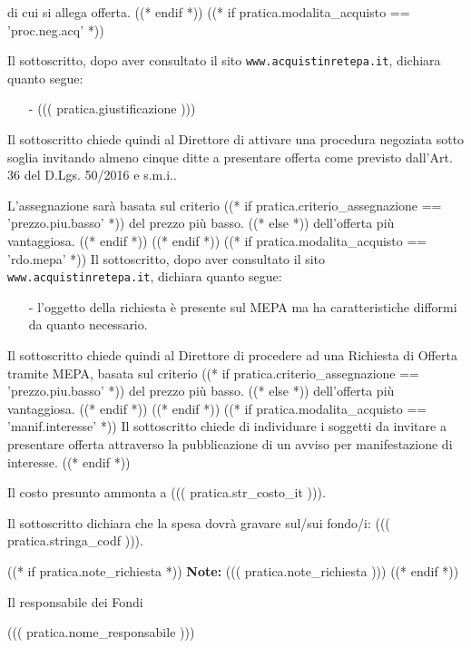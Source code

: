 \documentclass[a4paper,12pt]{letter}
\begin{document}
di cui si allega offerta.
((* endif *))
((* if pratica.modalita_acquisto == 'proc.neg.acq' *))

Il sottoscritto, dopo aver consultato il sito {\tt www.acquistinretepa.it},
dichiara quanto segue:

\begin{itemize}
\item[-] ((( pratica.giustificazione )))
\end{itemize}

Il sottoscritto chiede quindi al Direttore di attivare una procedura negoziata
sotto soglia invitando almeno cinque ditte a presentare offerta come previsto
dall'Art. 36 del D.Lgs. 50/2016 e s.m.i..

L'assegnazione sar\`a basata sul criterio %
   ((* if pratica.criterio_assegnazione == 'prezzo.piu.basso' *)) %
del prezzo pi\`u basso.
   ((* else *)) %
dell'offerta pi\`u vantaggiosa.
   ((* endif *))
((* endif *))
((* if pratica.modalita_acquisto == 'rdo.mepa' *))
Il sottoscritto, dopo aver consultato il sito {\tt www.acquistinretepa.it},
dichiara quanto segue:

\begin{itemize}
\item[-] l'oggetto della richiesta \`e presente sul MEPA ma ha caratteristiche difformi
da quanto necessario.
\end{itemize}

Il sottoscritto chiede quindi al Direttore di procedere ad una Richiesta di Offerta
tramite MEPA, basata sul criterio %
   ((* if pratica.criterio_assegnazione == 'prezzo.piu.basso' *)) %
del prezzo pi\`u basso.
   ((* else *)) %
dell'offerta pi\`u vantaggiosa.
   ((* endif *))
((* endif *))
((* if pratica.modalita_acquisto == 'manif.interesse' *))
Il sottoscritto chiede di individuare i soggetti da invitare a presentare offerta
attraverso la pubblicazione di un avviso per manifestazione di interesse.
((* endif *))

Il costo presunto ammonta a ((( pratica.str_costo_it ))).

Il sottoscritto dichiara che la spesa dovr\`a gravare sul/sui fondo/i:
((( pratica.stringa_codf ))). 

((* if pratica.note_richiesta *))
{\bf Note:} ((( pratica.note_richiesta )))
((* endif *))

\vspace{0.5cm}

\begin{flushright}
\begin{minipage}[c]{6cm}
Il responsabile dei Fondi

((( pratica.nome_responsabile )))

\end{minipage}
\end{flushright}
\end{document}
